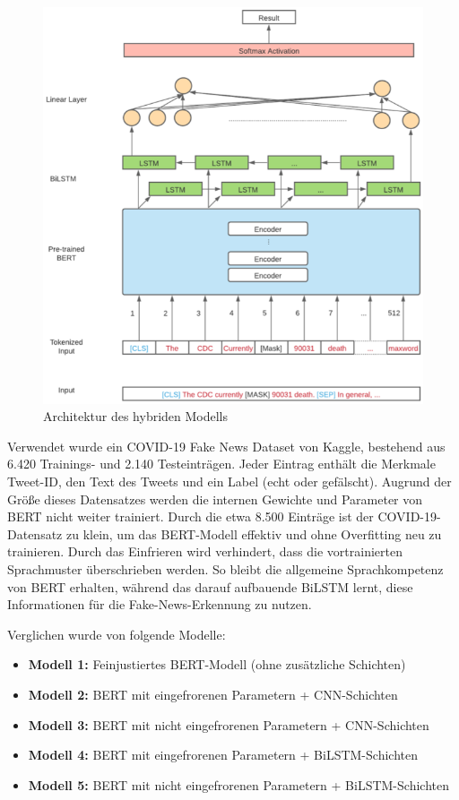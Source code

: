 \begin{figure}[htbp]
    \begin{center}
        \includegraphics[scale=0.45]{static/bert_bilstm_architecture.png}
        \caption{\label{fig:bert_bilstm_architecture} Architektur des hybriden Modells \cite{wang2021covid19fakenewsdetection}}
    \end{center}
\end{figure}

Verwendet wurde ein COVID-19 Fake News Dataset von Kaggle, bestehend aus 6.420 Trainings- und 2.140 Testeinträgen. 
Jeder Eintrag enthält die Merkmale Tweet-ID, den Text des Tweets und ein Label (echt oder gefälscht).
Augrund der Größe dieses Datensatzes werden die internen Gewichte und Parameter von BERT nicht weiter trainiert.
Durch die etwa 8.500 Einträge ist der COVID-19-Datensatz zu klein, um das BERT-Modell effektiv und ohne Overfitting neu zu trainieren.
Durch das Einfrieren wird verhindert, dass die vortrainierten Sprachmuster überschrieben werden. 
So bleibt die allgemeine Sprachkompetenz von BERT erhalten, während das darauf aufbauende BiLSTM lernt, 
diese Informationen für die Fake-News-Erkennung zu nutzen.

Verglichen wurde von \cite{wang2021covid19fakenewsdetection} folgende Modelle:
\begin{itemize}
    \item \textbf{Modell 1:} Feinjustiertes BERT-Modell (ohne zusätzliche Schichten)
    \item \textbf{Modell 2:} BERT mit eingefrorenen Parametern + CNN-Schichten
    \item \textbf{Modell 3:} BERT mit nicht eingefrorenen Parametern + CNN-Schichten
    \item \textbf{Modell 4:} BERT mit eingefrorenen Parametern + BiLSTM-Schichten
    \item \textbf{Modell 5:} BERT mit nicht eingefrorenen Parametern + BiLSTM-Schichten
\end{itemize}

